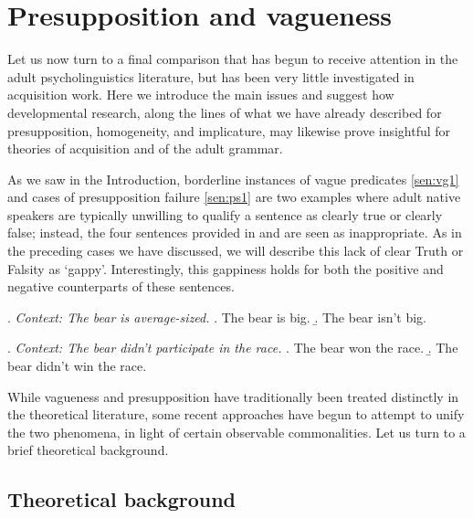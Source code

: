 \documentclass[12pt, letterpaper]{article}
\begin{document}
{%
\section{Presupposition and vagueness}

Let us now turn to a final comparison that has begun to receive attention in the adult psycholinguistics literature, but has been very little investigated in acquisition work. Here we introduce the main issues and suggest how developmental research, along the lines of what we have already described for presupposition, homogeneity, and implicature, may likewise prove insightful for theories of acquisition and of the adult grammar.

As we saw in the Introduction, borderline instances of vague predicates \ref{sen:vg1} and cases of presupposition failure \ref{sen:ps1} are two examples where adult native speakers are typically unwilling to qualify a sentence as clearly true or clearly false; instead, the four sentences provided in \Next and \NNext are seen as inappropriate. As in the preceding cases we have discussed, we will describe this lack of clear Truth or Falsity as `gappy'. Interestingly, this gappiness holds for both the positive and negative counterparts of these sentences.

\ex.	\label{sen:vg1}	\textit{Context: The bear is average-sized.}
\a.	\label{sen:vg1pos}The bear is big. %
\b.	\label{sen:vg1neg}The bear isn't big. %

\ex.	\label{sen:ps1}	\textit{Context: The bear didn't participate in the race.}
\a.	\label{sen:ps1pos}The bear won the race. %
\b.	\label{sen:ps1neg}The bear didn't win the race. %

While vagueness and presupposition have traditionally been treated distinctly in the theoretical literature, some recent approaches have begun to attempt to unify the two phenomena, in light of certain observable commonalities. Let us turn to a brief theoretical background. 

\subsection{Theoretical background}

}
\end{document}
